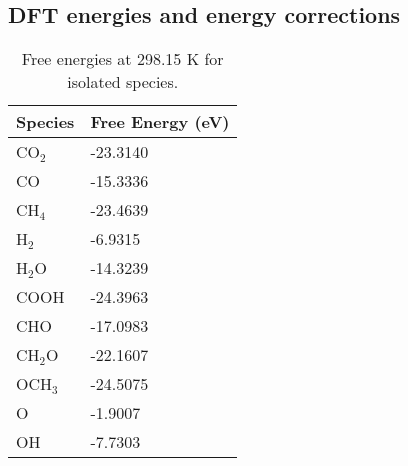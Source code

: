 \subsection{DFT energies and energy corrections}


\begin{table}[h]
  \centering
  {\fontsize{10}{12}\selectfont
  \begin{tabular}{ll}
    \hline
    \textbf{Species} & \textbf{Free Energy (eV)} \\
    \hline
    CO$_2$           & -23.3140                  \\
    CO               & -15.3336                  \\
    CH$_4$           & -23.4639                  \\
    H$_2$            & -6.9315                   \\
    H$_2$O           & -14.3239                  \\
    COOH             & -24.3963                  \\
    CHO              & -17.0983                  \\
    CH$_2$O          & -22.1607                  \\
    OCH$_3$          & -24.5075                  \\
    O                & -1.9007                   \\
    OH               & -7.7303                   \\
    \hline
  \end{tabular}
  }
  \caption{Free energies at 298.15 K for isolated species.}
  \label{si_table2:species_free_energies}
\end{table}


